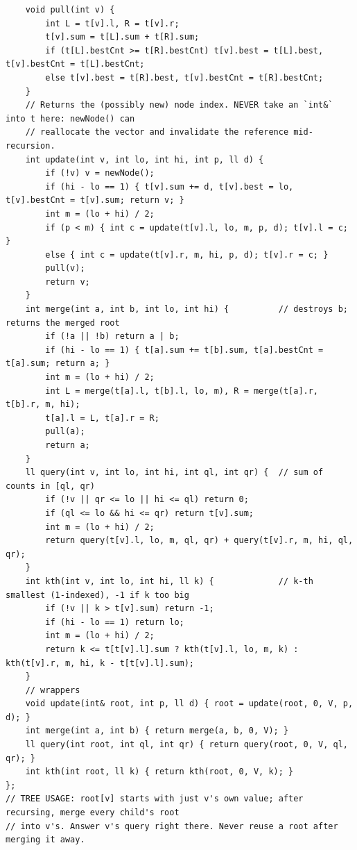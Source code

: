 \documentclass[9pt,a4paper,twocolumn]{extarticle}
\begin{document}
\begin{lstlisting}
    void pull(int v) {
        int L = t[v].l, R = t[v].r;
        t[v].sum = t[L].sum + t[R].sum;
        if (t[L].bestCnt >= t[R].bestCnt) t[v].best = t[L].best, t[v].bestCnt = t[L].bestCnt;
        else t[v].best = t[R].best, t[v].bestCnt = t[R].bestCnt;
    }
    // Returns the (possibly new) node index. NEVER take an `int&` into t here: newNode() can
    // reallocate the vector and invalidate the reference mid-recursion.
    int update(int v, int lo, int hi, int p, ll d) {
        if (!v) v = newNode();
        if (hi - lo == 1) { t[v].sum += d, t[v].best = lo, t[v].bestCnt = t[v].sum; return v; }
        int m = (lo + hi) / 2;
        if (p < m) { int c = update(t[v].l, lo, m, p, d); t[v].l = c; }
        else { int c = update(t[v].r, m, hi, p, d); t[v].r = c; }
        pull(v);
        return v;
    }
    int merge(int a, int b, int lo, int hi) {          // destroys b; returns the merged root
        if (!a || !b) return a | b;
        if (hi - lo == 1) { t[a].sum += t[b].sum, t[a].bestCnt = t[a].sum; return a; }
        int m = (lo + hi) / 2;
        int L = merge(t[a].l, t[b].l, lo, m), R = merge(t[a].r, t[b].r, m, hi);
        t[a].l = L, t[a].r = R;
        pull(a);
        return a;
    }
    ll query(int v, int lo, int hi, int ql, int qr) {  // sum of counts in [ql, qr)
        if (!v || qr <= lo || hi <= ql) return 0;
        if (ql <= lo && hi <= qr) return t[v].sum;
        int m = (lo + hi) / 2;
        return query(t[v].l, lo, m, ql, qr) + query(t[v].r, m, hi, ql, qr);
    }
    int kth(int v, int lo, int hi, ll k) {             // k-th smallest (1-indexed), -1 if k too big
        if (!v || k > t[v].sum) return -1;
        if (hi - lo == 1) return lo;
        int m = (lo + hi) / 2;
        return k <= t[t[v].l].sum ? kth(t[v].l, lo, m, k) : kth(t[v].r, m, hi, k - t[t[v].l].sum);
    }
    // wrappers
    void update(int& root, int p, ll d) { root = update(root, 0, V, p, d); }
    int merge(int a, int b) { return merge(a, b, 0, V); }
    ll query(int root, int ql, int qr) { return query(root, 0, V, ql, qr); }
    int kth(int root, ll k) { return kth(root, 0, V, k); }
};
// TREE USAGE: root[v] starts with just v's own value; after recursing, merge every child's root
// into v's. Answer v's query right there. Never reuse a root after merging it away.
\end{lstlisting}

\filbreak
\end{document}
